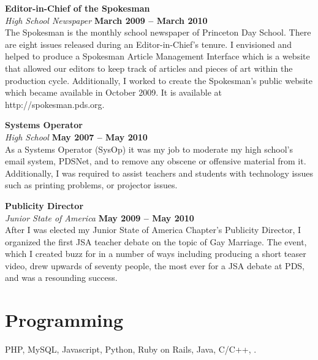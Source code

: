 \documentclass[margin,line]{resume}
\begin{document}
\begin{resume}
    \textbf{Editor-in-Chief of the Spokesman}\vspace{2mm}\\\vspace{1mm}%
    \textsl{High School Newspaper} \hfill \textbf{March 2009 -- March 2010}\\
    The Spokesman is the monthly school newspaper of Princeton Day School. There are eight issues released during an Editor-in-Chief’s tenure.  I envisioned and helped to produce a Spokesman Article Management Interface which is a website that allowed our editors to keep track of articles and pieces of art within the production cycle.  Additionally, I worked to create the Spokesman’s public website which became available in October 2009. It is available at {\color{blue} http://spokesman.pds.org.}

    \textbf{Systems Operator} \vspace{2mm}\\\vspace{1mm}%
    \textsl{High School} \hfill \textbf{May 2007 -- May 2010}\\
     As a Systems Operator (SysOp) it was my job to moderate my high school's email system, PDSNet, and to remove any obscene or offensive material from it.  Additionally, I was required to assist teachers and students with technology issues such as printing problems, or projector issues.

    \textbf{Publicity Director} \vspace{2mm}\\\vspace{1mm}%
    \textsl{Junior State of America} \hfill \textbf{May 2009 -- May 2010}\\
     After I was elected my Junior State of America Chapter’s Publicity Director, I organized the first JSA teacher debate on the topic of Gay Marriage.  The event, which I created buzz for in a number of ways including producing a short teaser video, drew upwards of seventy people, the most ever for a JSA debate at PDS, and was a resounding success.





    \section{\mysidestyle Programming} 

   PHP, MySQL, Javascript, Python, Ruby on Rails, Java, C/C++, \LaTeXe.




\end{resume}
\end{document}
